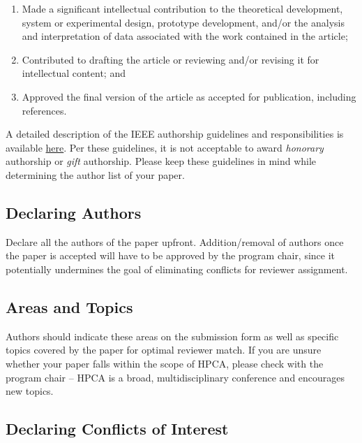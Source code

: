\documentclass{sig-alternate}
\begin{document}
\begin{enumerate}

\item Made a significant intellectual contribution to the theoretical
  development, system or experimental design, prototype development,
  and/or the analysis and interpretation of data associated with the
  work contained in the article;

\item Contributed to drafting the article or reviewing and/or revising
  it for intellectual content; and

\item Approved the final version of the article as accepted for
  publication, including references.

\end{enumerate}

A detailed description of the IEEE authorship guidelines and
responsibilities is available
\href{https://www.ieee.org/publications_standards/publications/rights/Section821.html}{here}.
Per these guidelines, it is not acceptable to award {\em honorary }
authorship or {\em gift} authorship. Please keep these guidelines in
mind while determining the author list of your paper.


\subsection{Declaring Authors}

Declare all the authors of the paper upfront. Addition/removal of authors
once the paper is accepted will have to be approved by the program chair,
since it potentially undermines the goal of eliminating conflicts for
reviewer assignment.


\subsection{Areas and Topics}

Authors should indicate these areas on the submission form as
well as specific topics covered by the paper for optimal reviewer match. If
you are unsure whether your paper falls within the scope of HPCA, please
check with the program chair -- HPCA is a broad, multidisciplinary
conference and encourages new topics.

\subsection{Declaring Conflicts of Interest}
\end{document}
